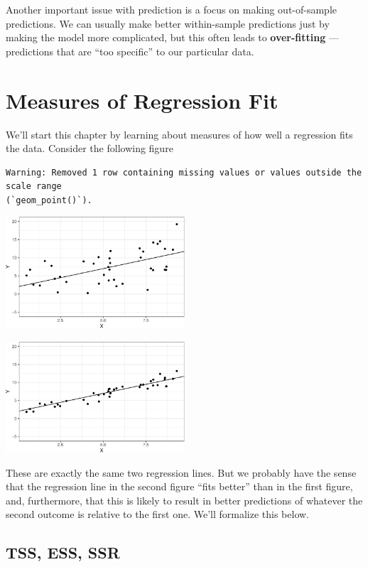 \documentclass[
  letterpaper,
  DIV=11,
  numbers=noendperiod]{scrreprt}
\begin{document}
Another important issue with prediction is a focus on making
out-of-sample predictions. We can usually make better within-sample
predictions just by making the model more complicated, but this often
leads to \textbf{over-fitting} --- predictions that are ``too specific''
to our particular data.

\section{Measures of Regression Fit}\label{measures-of-regression-fit}

We'll start this chapter by learning about measures of how well a
regression fits the data. Consider the following figure

\begin{verbatim}
Warning: Removed 1 row containing missing values or values outside the scale range
(`geom_point()`).
\end{verbatim}

\includegraphics[width=0.5\textwidth,height=\textheight]{05-prediction_files/figure-pdf/unnamed-chunk-1-1.pdf}

\includegraphics[width=0.5\textwidth,height=\textheight]{05-prediction_files/figure-pdf/unnamed-chunk-1-2.pdf}

These are exactly the same two regression lines. But we probably have
the sense that the regression line in the second figure ``fits better''
than in the first figure, and, furthermore, that this is likely to
result in better predictions of whatever the second outcome is relative
to the first one. We'll formalize this below.

\subsection{TSS, ESS, SSR}\label{tss-ess-ssr}
\end{document}
